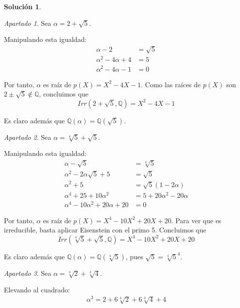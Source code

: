 \documentclass[a4paper, 11pt]{article}
\theoremstyle{definition}
\newtheorem*{solucion}{Solución}
\theoremstyle{remark}
\newtheorem{apartado}{Apartado}[ejercicio]
\begin{document}
  \begin{solucion}
      \begin{apartado}
          Sea $\alpha = 2 + \sqrt{5}$.

          Manipulando esta igualdad:
          \begin{align*}
              \alpha - 2 &= \sqrt{5} \\
              \alpha^2 - 4\alpha + 4 &= 5 \\
              \alpha^2 - 4\alpha - 1 &= 0
          \end{align*}

          Por tanto, $\alpha$ es raíz de $p(X) = X^2 -4X -1$. Como las raíces de $p(X)$ son $2 \pm \sqrt{5}\notin\mathbb{Q}$, concluimos que
          \[
          Irr(2 + \sqrt{5}, \mathbb{Q}) = X^2 - 4X - 1
          \]

          Es claro además que $\mathbb{Q}(\alpha) = \mathbb{Q}(\sqrt{5})$.
      \end{apartado}

      \begin{apartado}
          Sea $\alpha = \sqrt[4]{5} + \sqrt{5}$.

          Manipulando esta igualdad:
          \begin{align*}
              \alpha - \sqrt{5} &= \sqrt[4]{5} \\
              \alpha^2 - 2\alpha\sqrt{5} + 5 &= \sqrt{5} \\
              \alpha^2 + 5 &= \sqrt{5}(1-2\alpha) \\
              \alpha^4 + 25 + 10\alpha^2 &= 5+20\alpha^2-20\alpha \\
              \alpha^4 - 10\alpha^2 + 20\alpha + 20 &= 0
          \end{align*}

          Por tanto, $\alpha$ es raíz de $p(X) = X^4 - 10X^2 + 20X + 20$. Para ver que es irreducible, basta aplicar Eisenstein con el primo 5. Concluimos que
          \[
          Irr(\sqrt[4]{5} + \sqrt{5}, \mathbb{Q}) = X^4 - 10X^2 + 20X + 20
          \]

          Es claro además que $\mathbb{Q}(\alpha) = \mathbb{Q}(\sqrt[4]{5})$, pues $\sqrt{5} = \sqrt[4]{5}^4$.
      \end{apartado}

      \begin{apartado}
          Sea $\alpha = \sqrt[3]{2} + \sqrt[3]{4}$.

          Elevando al cuadrado:
          \begin{align*}
              \alpha^3 = 2 + 6\sqrt[3]{2} + 6\sqrt[3]{4} + 4
          \end{align*}


\end{apartado}
\end{solucion}
\end{document}
